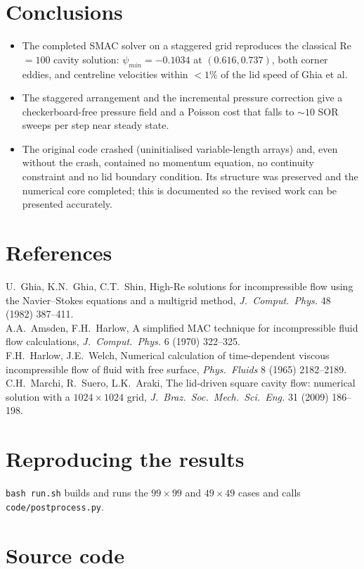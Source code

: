 \section{Conclusions}
\begin{itemize}
\item The completed SMAC solver on a staggered grid reproduces the classical Re $=100$ cavity solution: $\psi_{min}=-0.1034$ at $(0.616,0.737)$, both corner eddies, and centreline velocities within $<1\%$ of the lid speed of Ghia et al.
\item The staggered arrangement and the incremental pressure correction give a checkerboard-free pressure field and a Poisson cost that falls to $\sim10$ SOR sweeps per step near steady state.
\item The original code crashed (uninitialised variable-length arrays) and, even without the crash, contained no momentum equation, no continuity constraint and no lid boundary condition. Its structure was preserved and the numerical core completed; this is documented so the revised work can be presented accurately.
\end{itemize}

\section*{References}
\small
U.\ Ghia, K.N.\ Ghia, C.T.\ Shin, High-Re solutions for incompressible flow using the Navier--Stokes equations and a multigrid method, \emph{J.\ Comput.\ Phys.} 48 (1982) 387--411.\\
A.A.\ Amsden, F.H.\ Harlow, A simplified MAC technique for incompressible fluid flow calculations, \emph{J.\ Comput.\ Phys.} 6 (1970) 322--325.\\
F.H.\ Harlow, J.E.\ Welch, Numerical calculation of time-dependent viscous incompressible flow of fluid with free surface, \emph{Phys.\ Fluids} 8 (1965) 2182--2189.\\
C.H.\ Marchi, R.\ Suero, L.K.\ Araki, The lid-driven square cavity flow: numerical solution with a $1024\times1024$ grid, \emph{J.\ Braz.\ Soc.\ Mech.\ Sci.\ Eng.} 31 (2009) 186--198.
\normalsize
\section*{Reproducing the results}
\texttt{bash run.sh} builds and runs the $99\times99$ and $49\times49$ cases and calls \texttt{code/postprocess.py}.

\appendix\section{Source code}



